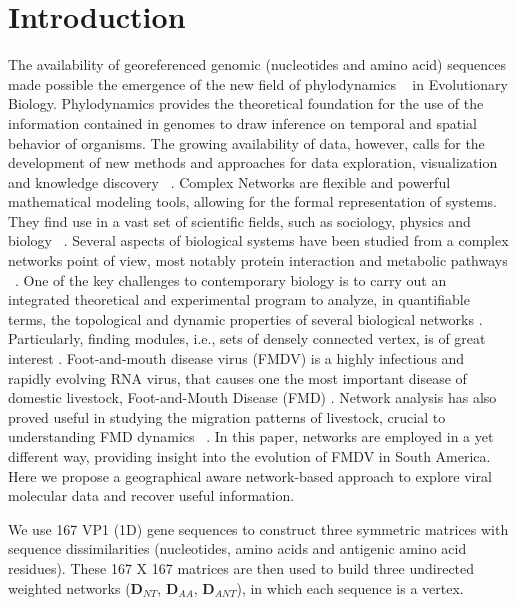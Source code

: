 \documentclass[10pt,letterpaper]{article}
\begin{document}
\section*{Introduction}
The availability of georeferenced genomic (nucleotides and amino acid) sequences made possible the emergence of the new field of phylodynamics ~\cite{grenfell, MEP} in Evolutionary Biology. Phylodynamics provides the theoretical foundation for the use of the information contained in genomes to draw inference on temporal and spatial behavior of organisms. The growing availability of data, however, calls for the development of new  methods and approaches for data exploration, visualization and knowledge discovery ~\cite{putting, cancer, PRE, Gavin2004, Pirovani}.
%
%
Complex Networks are flexible and powerful mathematical modeling tools, allowing for the formal representation of systems. They find use in a vast set of scientific fields, such as sociology, physics and biology ~\cite{Barabasi2004, newman, surprise1, surprise2, watts, guell2012}. Several aspects of biological systems have been studied from a complex networks point of view, most notably protein interaction and metabolic pathways ~\cite{GoesNeto2010, surprise2, metabolic, guell2012}.
One of the key challenges to contemporary biology is to carry out an integrated theoretical and experimental program to analyze, in quantifiable terms, the topological and dynamic properties of several biological networks \cite{Barabasi2004}. Particularly, finding modules, i.e., sets of densely connected vertex, is of great interest \cite{newman, surprise1, surprise2, Andrade2011}.
Foot-and-mouth disease virus (FMDV) is a highly infectious and rapidly evolving RNA virus, that causes one the most important disease of domestic livestock, Foot-and-Mouth Disease (FMD) \cite{Malirat2007, Perez2001, Malirat2012A, andean, Carvalho2012}. Network analysis has also proved useful in studying the migration patterns of livestock, crucial to understanding FMD dynamics ~\cite{review, cattle}.
In this paper, networks are employed in a yet different way, providing insight into the evolution of FMDV in South America. Here we propose a geographical aware network-based approach to explore viral molecular data and recover useful information.

We use 167 VP1 (1D) gene sequences to construct three symmetric matrices with sequence dissimilarities (nucleotides, amino acids and antigenic amino acid residues). These 167 X 167 matrices are then used to build three undirected weighted networks ($\mathbf{D}_{NT}$, $\mathbf{D}_{AA}$, $\mathbf{D}_{ANT}$), in which each sequence is a vertex.
\end{document}

